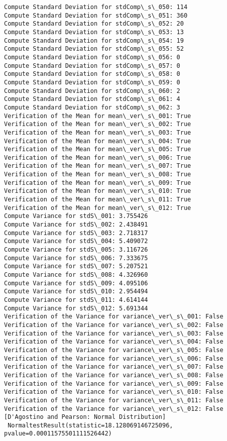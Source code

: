 \documentclass[11pt]{article}
\begin{document}
\begin{Verbatim}[commandchars=\\\{\}]
Compute Standard Deviation for stdComp\_s\_050: 114
Compute Standard Deviation for stdComp\_s\_051: 360
Compute Standard Deviation for stdComp\_s\_052: 20
Compute Standard Deviation for stdComp\_s\_053: 13
Compute Standard Deviation for stdComp\_s\_054: 19
Compute Standard Deviation for stdComp\_s\_055: 52
Compute Standard Deviation for stdComp\_s\_056: 0
Compute Standard Deviation for stdComp\_s\_057: 0
Compute Standard Deviation for stdComp\_s\_058: 0
Compute Standard Deviation for stdComp\_s\_059: 0
Compute Standard Deviation for stdComp\_s\_060: 2
Compute Standard Deviation for stdComp\_s\_061: 4
Compute Standard Deviation for stdComp\_s\_062: 3
Verification of the Mean for mean\_ver\_s\_001: True
Verification of the Mean for mean\_ver\_s\_002: True
Verification of the Mean for mean\_ver\_s\_003: True
Verification of the Mean for mean\_ver\_s\_004: True
Verification of the Mean for mean\_ver\_s\_005: True
Verification of the Mean for mean\_ver\_s\_006: True
Verification of the Mean for mean\_ver\_s\_007: True
Verification of the Mean for mean\_ver\_s\_008: True
Verification of the Mean for mean\_ver\_s\_009: True
Verification of the Mean for mean\_ver\_s\_010: True
Verification of the Mean for mean\_ver\_s\_011: True
Verification of the Mean for mean\_ver\_s\_012: True
Compute Variance for stdS\_001: 3.755426
Compute Variance for stdS\_002: 2.438491
Compute Variance for stdS\_003: 2.718317
Compute Variance for stdS\_004: 5.409072
Compute Variance for stdS\_005: 3.116726
Compute Variance for stdS\_006: 7.333675
Compute Variance for stdS\_007: 5.207521
Compute Variance for stdS\_008: 4.326960
Compute Variance for stdS\_009: 4.095106
Compute Variance for stdS\_010: 2.954494
Compute Variance for stdS\_011: 4.614144
Compute Variance for stdS\_012: 5.691344
Verification of the Variance for variance\_ver\_s\_001: False
Verification of the Variance for variance\_ver\_s\_002: False
Verification of the Variance for variance\_ver\_s\_003: False
Verification of the Variance for variance\_ver\_s\_004: False
Verification of the Variance for variance\_ver\_s\_005: False
Verification of the Variance for variance\_ver\_s\_006: False
Verification of the Variance for variance\_ver\_s\_007: False
Verification of the Variance for variance\_ver\_s\_008: False
Verification of the Variance for variance\_ver\_s\_009: False
Verification of the Variance for variance\_ver\_s\_010: False
Verification of the Variance for variance\_ver\_s\_011: False
Verification of the Variance for variance\_ver\_s\_012: False
[D'Agostino and Pearson: Normal Distribution]
 NormaltestResult(statistic=18.128069146725096, pvalue=0.00011575501111526442)

\end{Verbatim}
\end{document}

